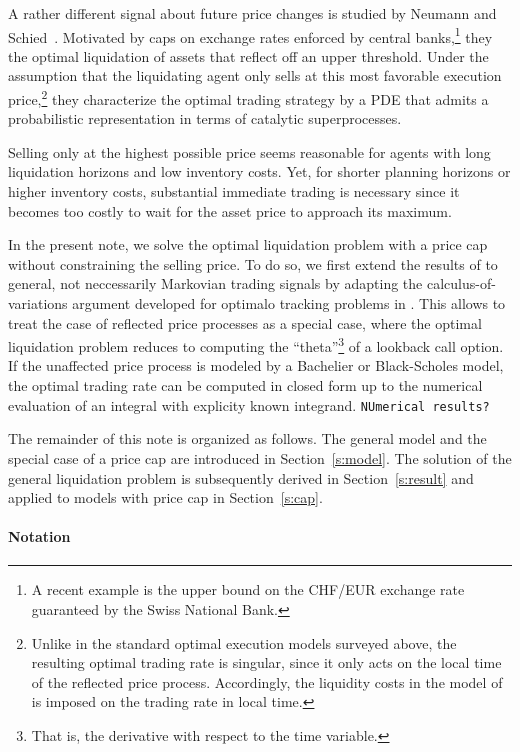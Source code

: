 \documentclass[11pt]{article}
\theoremstyle{definition}
\theoremstyle{remark}
\begin{document}
A rather different signal about future price changes is studied by Neumann and Schied~\cite{neumann.schied.??}. Motivated by caps on exchange rates enforced by central banks,\footnote{A recent example is the upper bound on the CHF/EUR exchange rate guaranteed by the Swiss National Bank.} they the optimal liquidation of assets that reflect off an upper threshold.  Under the assumption that the liquidating agent only sells at this most favorable execution price,\footnote{Unlike in the standard optimal execution models surveyed above, the resulting optimal trading rate is singular, since it only acts on the local time of the reflected price process. Accordingly, the liquidity costs in the model of \cite{neumann.schied.??} is imposed on the trading rate in local time.} they characterize the optimal trading strategy by a PDE that admits a probabilistic representation in terms of catalytic superprocesses. 

Selling only at the highest possible price seems reasonable for agents with long liquidation horizons and low inventory costs. Yet, for shorter planning horizons or higher inventory costs, substantial immediate trading is necessary since it becomes too costly to wait for the asset price to approach its maximum.

In the present note, we solve the optimal liquidation problem with a price cap without constraining the selling price. To do so, we first extend the results of \cite{lehalle2017incorporating} to general, not neccessarily Markovian trading signals by adapting the calculus-of-variations argument developed for optimalo tracking problems in \cite{bank.al.17,bouchard2017equilibrium}. This allows to treat the case of reflected price processes as a special case, where the optimal liquidation problem reduces to computing the ``theta''\footnote{That is, the derivative with respect to the time variable.} of a lookback call option. If the unaffected price process is modeled by a Bachelier or Black-Scholes model, the optimal trading rate can be computed in closed form up to the numerical evaluation of an integral with explicity known integrand. \texttt{NUmerical results?}

The remainder of this note is organized as follows. The general model and the special case of a price cap are introduced in Section~\ref{s:model}. The solution of the general liquidation problem is subsequently derived in Section~\ref{s:result} and applied to models with price cap in Section~\ref{s:cap}.

\paragraph{Notation}
\end{document}
